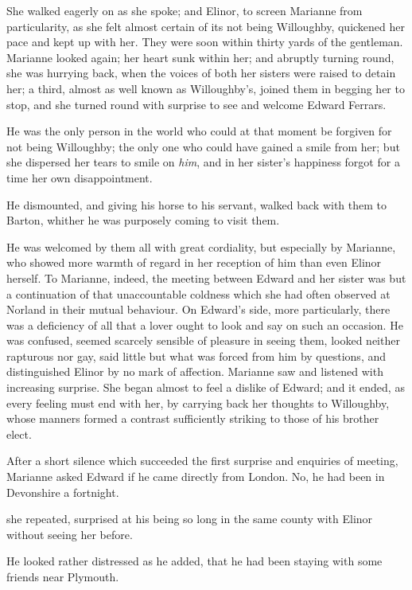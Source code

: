 She walked eagerly on as she spoke; and Elinor, to screen Marianne from particularity, as she felt almost certain of its not being Willoughby, quickened her pace and kept up with her. They were soon within thirty yards of the gentleman. Marianne looked again; her heart sunk within her; and abruptly turning round, she was hurrying back, when the voices of both her sisters were raised to detain her; a third, almost as well known as Willoughby's, joined them in begging her to stop, and she turned round with surprise to see and welcome Edward Ferrars.

He was the only person in the world who could at that moment be forgiven for not being Willoughby; the only one who could have gained a smile from her; but she dispersed her tears to smile on {\em him}, and in her sister's happiness forgot for a time her own disappointment.

He dismounted, and giving his horse to his servant, walked back with them to Barton, whither he was purposely coming to visit them.

He was welcomed by them all with great cordiality, but especially by Marianne, who showed more warmth of regard in her reception of him than even Elinor herself. To Marianne, indeed, the meeting between Edward and her sister was but a continuation of that unaccountable coldness which she had often observed at Norland in their mutual behaviour. On Edward's side, more particularly, there was a deficiency of all that a lover ought to look and say on such an occasion. He was confused, seemed scarcely sensible of pleasure in seeing them, looked neither rapturous nor gay, said little but what was forced from him by questions, and distinguished Elinor by no mark of affection. Marianne saw and listened with increasing surprise. She began almost to feel a dislike of Edward; and it ended, as every feeling must end with her, by carrying back her thoughts to Willoughby, whose manners formed a contrast sufficiently striking to those of his brother elect.

After a short silence which succeeded the first surprise and enquiries of meeting, Marianne asked Edward if he came directly from London. No, he had been in Devonshire a fortnight.

 she repeated, surprised at his being so long in the same county with Elinor without seeing her before.

He looked rather distressed as he added, that he had been staying with some friends near Plymouth.

